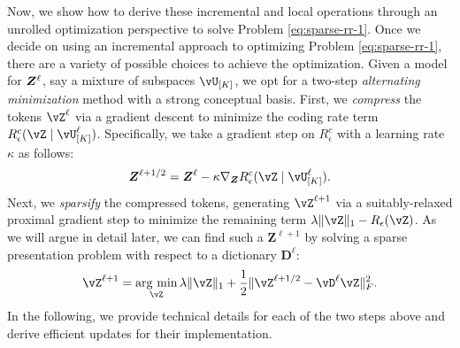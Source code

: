 \documentclass[../../book-main.tex]{subfiles}
\begin{document}
Now, we show how to derive these incremental and local operations through an unrolled optimization perspective to solve Problem \eqref{eq:sparse-rr-1}.  Once we decide on using an incremental approach to optimizing Problem
\eqref{eq:sparse-rr-1}, there are a variety of possible choices to achieve the optimization. Given a model for $\bm{Z}^\ell$, say a mixture of subspaces $\vU_{[K]}$, we opt for a two-step \textit{alternating minimization} method with a strong conceptual basis. First, we \textit{compress} the tokens $\vZ^{\ell}$ via a gradient descent to minimize the coding rate term $R^c_\epsilon (\vZ \mid \vU_{[K]}^\ell)$. Specifically, we take a gradient step on $R^c_\epsilon$ with a learning rate $\kappa$ as follows:
\begin{align}\label{eq:Z l+1/2}
    \bm Z^{\ell+1/2} = \bm Z^\ell - \kappa \nabla_{\bm Z} R^c_\epsilon (\vZ \mid \vU_{[K]}^\ell). 
\end{align}
Next, we \textit{sparsify} the compressed tokens, generating \(\vZ^{\ell + 1}\) via a suitably-relaxed proximal gradient step to minimize the remaining term $\lambda \norm{\vZ}_{1} - R_{\epsilon}(\vZ)$. As we will argue in detail later, we can find such a $\bm Z^{\ell+1}$ by solving a sparse presentation problem with respect to a dictionary $\bm D^\ell$:
\begin{equation}\label{eq:Z l+1}
  \vZ^{\ell+1} = \argmin_{{\vZ}}  \lambda \norm{\vZ}_1 + \frac{1}{2}\norm{\vZ^{\ell + 1/2} - \vD^{\ell} {\vZ}}_F^2.
\end{equation}
In the following, we provide technical details for each of the two steps above and derive efficient updates for their implementation.
\end{document}
